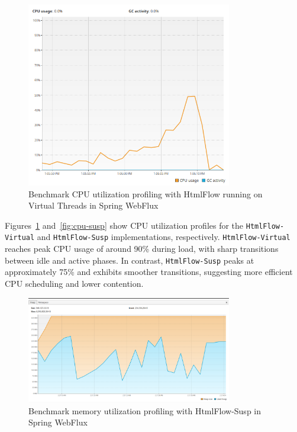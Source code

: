 \begin{figure}[h]
     \centering
     \includegraphics[width=0.8\textwidth]{./Graphs/cpu-virt.png}
     \caption{Benchmark CPU utilization profiling with HtmlFlow running on Virtual Threads in Spring WebFlux}\label{fig:cpu-virt}
\end{figure}

Figures~\ref{fig:cpu-virt} and~\ref{fig:cpu-susp} show CPU utilization profiles
for the \texttt{HtmlFlow-Virtual} and \texttt{HtmlFlow-Susp} implementations,
respectively. \texttt{HtmlFlow-Virtual} reaches peak CPU usage of around 90\%
during load, with sharp transitions between idle and active phases. In
contrast, \texttt{HtmlFlow-Susp} peaks at approximately 75\% and exhibits
smoother transitions, suggesting more efficient CPU scheduling and lower
contention.

\begin{figure}[h]
     \centering
     \includegraphics[width=0.8\textwidth]{./Graphs/gc-susp.png}
     \caption{Benchmark memory utilization profiling with HtmlFlow-Susp in Spring WebFlux}\label{fig:gc-susp}
\end{figure}

